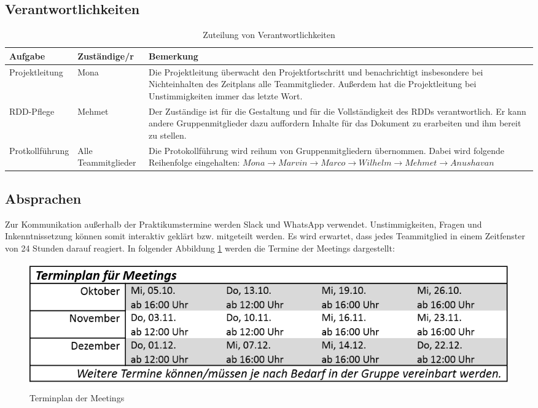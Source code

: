\documentclass[a4paper, 11pt]{article}
\begin{document}
\subsection{Verantwortlichkeiten}\label{vantw}
\begin{table}[h]
\center
\begin{tabularx}{\textwidth}{|l|l|X|}
\hline
\textbf{Aufgabe}&\textbf{Zuständige/r}&\textbf{Bemerkung}\\
\hline
Projektleitung&Mona&Die Projektleitung überwacht den Projektfortschritt und benachrichtigt insbesondere bei Nichteinhalten des Zeitplans alle Teammitglieder. Außerdem hat die Projektleitung bei Unstimmigkeiten immer das letzte Wort. \\
\hline
RDD-Pflege&Mehmet&Der Zuständige ist für die Gestaltung und für die Vollständigkeit des RDDs verantwortlich. Er kann andere Gruppenmitglieder dazu auffordern Inhalte für das Dokument zu erarbeiten und ihm bereit zu stellen. \\
\hline 
Protkollführung&Alle Teammitglieder&Die Protokollführung wird reihum von Gruppenmitgliedern übernommen. Dabei wird folgende Reihenfolge eingehalten: $Mona\rightarrow Marvin\rightarrow Marco \rightarrow Wilhelm\rightarrow Mehmet\rightarrow Anushavan$ \\
\hline
\end{tabularx}
\caption{Zuteilung von Verantwortlichkeiten}
\label{labelname}
\end{table}

\subsection{Absprachen}
Zur Kommunikation außerhalb der Praktikumstermine werden Slack und WhatsApp verwendet. Unstimmigkeiten, Fragen und Inkenntnissetzung können somit interaktiv geklärt bzw. mitgeteilt werden. Es wird erwartet, dass jedes Teammitglied in einem Zeitfenster von 24 Stunden darauf reagiert. In folgender Abbildung \ref{meets} werden die Termine der Meetings dargestellt:
\begin{figure}[h]
\centering 
\includegraphics[scale=0.85]{images/Terminplan_Meetings.png}
\caption{Terminplan der Meetings}
\label{meets}
\end{figure}
\end{document}
